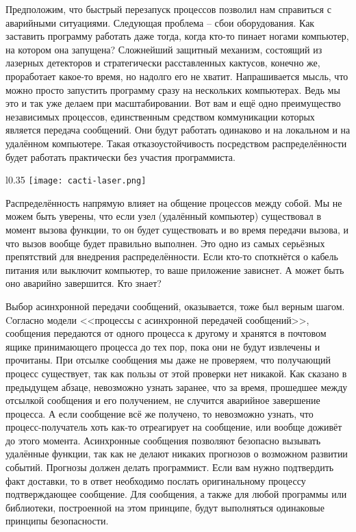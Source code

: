 Предположим, что быстрый перезапуск процессов позволил нам справиться с аварийными ситуациями.
Следующая проблема \--- сбои оборудования.
Как заставить программу работать даже тогда, когда кто\--то пинает ногами компьютер, на котором она запущена?
Сложнейший защитный механизм, состоящий из лазерных детекторов и стратегически расставленных кактусов, конечно же, проработает какое\--то время, но надолго его не хватит.
Напрашивается мысль, что можно просто запустить программу сразу на нескольких компьютерах.
Ведь мы это и так уже делаем при масштабировании.
Вот вам и ещё одно преимущество независимых процессов, единственным средством коммуникации которых является передача сообщений.
Они будут работать одинаково и на локальном и на удалённом компьютере.
Такая отказоустойчивость посредством распределённости будет работать практически без участия программиста.
\begin{wrapfigure}{l}{0.35\linewidth}
    \texttt{[image: cacti-laser.png]}
\end{wrapfigure}

Распределённость напрямую влияет на общение процессов между собой.
Мы не можем быть уверены, что если узел (удалённый компьютер) существовал в момент вызова функции, то он будет существовать и во время передачи вызова, и что вызов вообще будет правильно выполнен.
Это одно из самых серьёзных препятствий для внедрения распределённости.
Если кто\--то споткнётся о кабель питания или выключит компьютер, то ваше приложение зависнет.
А может быть оно аварийно завершится.
Кто знает?

Выбор асинхронной передачи сообщений, оказывается, тоже был верным шагом.
Cогласно модели <<процессы с асинхронной передачей сообщений>>, сообщения передаются от одного процесса к другому и хранятся в почтовом ящике принимающего процесса до тех пор, пока они не будут извлечены и прочитаны.
При отсылке сообщения мы даже не проверяем, что получающий процесс существует, так как пользы от этой проверки нет никакой.
Как сказано в предыдущем абзаце, невозможно узнать заранее, что за время, прошедшее между отсылкой сообщения и его получением, не случится аварийное завершение процесса.
А если сообщение всё же получено, то невозможно узнать, что процесс\--получатель хоть как\--то отреагирует на сообщение, или вообще доживёт до этого момента.
Асинхронные сообщения позволяют безопасно вызывать удалённые функции, так как не делают никаких прогнозов о возможном развитии событий.
Прогнозы  должен делать программист.
Если вам нужно подтвердить факт доставки, то в ответ необходимо послать оригинальному процессу подтверждающее сообщение.
Для сообщения, а также для любой программы или библиотеки, построенной на этом принципе, будут выполняться одинаковые принципы безопасности.
